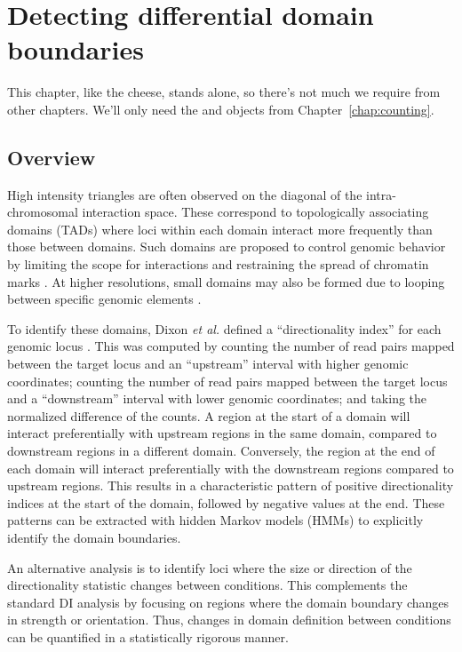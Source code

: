 \documentclass{report}\usepackage[]{graphicx}\usepackage[usenames,dvipsnames]{color}
\newenvironment{combox}
{ \definecolor{shadecolor}{RGB}{255, 240, 240} \begin{shaded}\begin{center}\begin{minipage}[t]{0.95\textwidth} }
{ \end{minipage}\end{center}\end{shaded} \definecolor{shadecolor}{RGB}{240,240,240} }
\begin{document}
\chapter{Detecting differential domain boundaries}
\label{chap:domains}
\begin{combox}
This chapter, like the cheese, stands alone, so there's not much we require from other chapters.
We'll only need the  and  objects from Chapter~\ref{chap:counting}.
\end{combox}

\section{Overview}
High intensity triangles are often observed on the diagonal of the intra-chromosomal interaction space.
These correspond to topologically associating domains (TADs) where loci within each domain interact more frequently than those between domains.
Such domains are proposed to control genomic behavior by limiting the scope for interactions and restraining the spread of chromatin marks \cite{nora2013segmental}.
At higher resolutions, small domains may also be formed due to looping between specific genomic elements \cite{rao2014kilobase}.

To identify these domains, Dixon \emph{et al.} defined a ``directionality index'' for each genomic locus \cite{dixon2012topological}.
This was computed by counting the number of read pairs mapped between the target locus and an ``upstream'' interval with higher genomic coordinates;
    counting the number of read pairs mapped between the target locus and a ``downstream'' interval with lower genomic coordinates;
    and taking the normalized difference of the counts.
A region at the start of a domain will interact preferentially with upstream regions in the same domain, compared to downstream regions in a different domain.
Conversely, the region at the end of each domain will interact preferentially with the downstream regions compared to upstream regions.
This results in a characteristic pattern of positive directionality indices at the start of the domain, followed by negative values at the end.
These patterns can be extracted with hidden Markov models (HMMs) to explicitly identify the domain boundaries.

An alternative analysis is to identify loci where the size or direction of the directionality statistic changes between conditions.
This complements the standard DI analysis by focusing on regions where the domain boundary changes in strength or orientation.
Thus, changes in domain definition between conditions can be quantified in a statistically rigorous manner.
\end{document}
